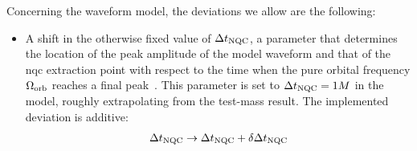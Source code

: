 \documentclass[prd,amssymb,amsmath,amsfonts,nofootinbib,reprint,showpacs,longbibliography]{revtex4-1}
\begin{document}
Concerning the waveform model, the deviations we allow are the following:
\begin{itemize}
    \item A shift in the otherwise fixed value of $\Delta t_{\rm NQC}$, a parameter that determines the location
    of the peak amplitude of the model waveform and that of the \ac{nqc} extraction point with respect to the
    time when the pure orbital frequency $\Omega_{\rm orb}$ reaches a final peak~\cite{Damour:2014sva,Nagar:2024oyk}.
    This parameter is set to $\Delta t_{\rm NQC} = 1M$ in the model, roughly extrapolating from the test-mass result.
    The implemented deviation is additive:
    \begin{equation}
    \Delta t_{\rm NQC} \rightarrow \Delta t_{\rm NQC} + \delta \Delta t_{\rm NQC}
    \end{equation}


\end{itemize}
\end{document}
